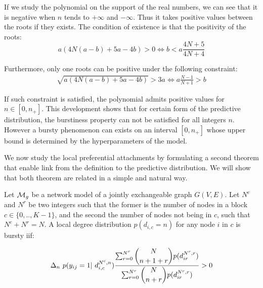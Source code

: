 If we study the polynomial on the support of the real numbers, we can see that it is negative when $n$ tends to $+\infty$ and $-\infty$. Thus it takes positive values between the roots if they exists. The condition of existence is that the positivity of the roots:
\begin{equation*}
a(4N(a-b)+5a-4b) > 0 \iff b < a \frac{4N+5}{4N+4}
\end{equation*}

Furthermore, only one roots can be positive under the following constraint:
\begin{align*}
\sqrt{a(4N(a-b)+5a-4b)} > 3a \iff a\frac{N-1}{N+1} > b
\end{align*}

If such constraint is satisfied, the polynomial admits positive values for $n \in [0, n_+]$. This development shows that for certain form of the predictive distribution, the burstiness property can not be satisfied for all integers $n$. However a bursty phenomenon can exists on an interval $[0, n_+]$ whose upper bound is determined by the hyperparameters of the model.

We now study the local preferential attachments by formulating a second theorem that enable link from the definition to the predictive distribution. We will show that both theorem are related in a simple and natural way.

\begin{theorem} \label{th:burst_local}
    Let $\mathcal{M}_g$ be a network model of a jointly exchangeable graph $G(V,E)$. Let $N^c$ and $N^r$ be two integers such that the former is the number of nodes in a block $c \in \{0,.., K-1\}$, and the second the number of nodes not being in $c$, such that $N^c+N^r = N$. A local degree distribution $p(d_{i,c}=n)$ for any node $i$ in $c$ is bursty iif:
	
\begin{equation}
\Delta_n\   p(y_{ij}=1 | d_{i,c}^{N^c,n}) \frac{\sum_{r=0}^{N^r}\dbinom{N}{n+1+r} p(d_{ir}^{N^r,r})}{\sum_{r=0}^{N^r} \dbinom{N}{n+r} p(d_{ir}^{N^r,r}) } > 0
\end{equation}
	
\end{theorem}


